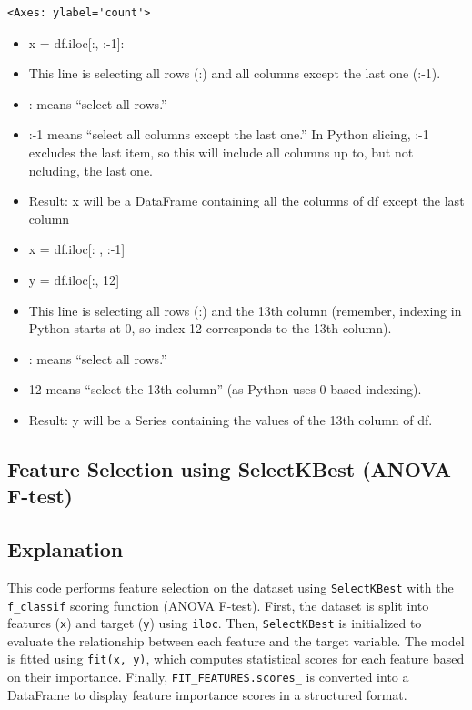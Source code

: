 \documentclass[11pt,a4paper]{report}
\makeatletter
\providecommand{\tightlist}{%
      \setlength{\itemsep}{0pt}\setlength{\parskip}{0pt}}
\newcommand{\boxspacing}{\kern\kvtcb@left@rule\kern\kvtcb@boxsep}
\newcommand{\prompt}[4]{
        {\ttfamily\llap{{\color{#2}[#3]:\hspace{3pt}#4}}\vspace{-\baselineskip}}
    }
\makeatother
\begin{document}
            \begin{tcolorbox}[breakable, size=fbox, boxrule=.5pt, pad at break*=1mm, opacityfill=0]
\prompt{Out}{outcolor}{66}{\boxspacing}
\begin{Verbatim}[commandchars=\\\{\}]
<Axes: ylabel='count'>
\end{Verbatim}
\end{tcolorbox}
        
    \begin{center}
    \end{center}
    
    \begin{itemize}
\tightlist
\item
  x = df.iloc{[}:, :-1{]}:
\item
  This line is selecting all rows (:) and all columns except the last
  one (:-1).
\item
  : means ``select all rows.''
\item
  :-1 means ``select all columns except the last one.'' In Python
  slicing, :-1 excludes the last item, so this will include all columns
  up to, but not ncluding, the last one.
\item
  Result: x will be a DataFrame containing all the columns of df except
  the last column
  
\item
  x = df.iloc[: , :-1]
\item
  y = df.iloc{[}:, 12{]}
\item
  This line is selecting all rows (:) and the 13th column (remember,
  indexing in Python starts at 0, so index 12 corresponds to the 13th
  column).
\item
  : means ``select all rows.''
\item
  12 means ``select the 13th column'' (as Python uses 0-based indexing).
\item
  Result: y will be a Series containing the values of the 13th column of
  df.
\end{itemize}


\subsection{Feature Selection using SelectKBest (ANOVA F-test)}
\subsection*{Explanation}
This code performs feature selection on the dataset using \texttt{SelectKBest} with the \texttt{f\_classif} scoring function (ANOVA F-test). First, the dataset is split into features (\texttt{x}) and target (\texttt{y}) using \texttt{iloc}. Then, \texttt{SelectKBest} is initialized to evaluate the relationship between each feature and the target variable. The model is fitted using \texttt{fit(x, y)}, which computes statistical scores for each feature based on their importance. Finally, \texttt{FIT\_FEATURES.scores\_} is converted into a DataFrame to display feature importance scores in a structured format.
\end{document}
